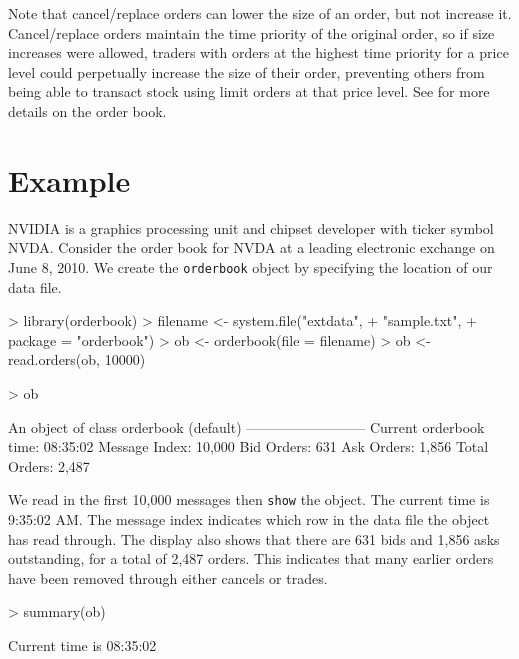 \documentclass[a4paper]{report}
\begin{document}
\begin{article}
Note that cancel/replace orders can lower the size of an order, but
not increase it. Cancel/replace orders maintain the time priority of
the original order, so if size increases were allowed, traders with
orders at the highest time priority for a price level could
perpetually increase the size of their order, preventing others from
being able to transact stock using limit orders at that price
level. See \cite{johnson:barry} for more details on the order book.

\section{Example}

NVIDIA is a graphics processing unit and chipset developer with ticker
symbol NVDA. Consider the order book for NVDA at a leading electronic
exchange on June 8, 2010. We create the \texttt{orderbook} object by
specifying the location of our data file.

\begin{Schunk}
\begin{Sinput}
> library(orderbook)
> filename <- system.file("extdata",
+                         "sample.txt",
+                         package = "orderbook")
> ob <- orderbook(file = filename)
> ob <- read.orders(ob, 10000)
\end{Sinput}
\end{Schunk}
\begin{Schunk}
\begin{Sinput}
> ob
\end{Sinput}
\begin{Soutput}
An object of class orderbook (default)
--------------------------
Current orderbook time:    08:35:02 
Message Index:             10,000 
Bid Orders:                631 
Ask Orders:                1,856 
Total Orders:              2,487 
\end{Soutput}
\end{Schunk}

We read in the first 10,000 messages then \texttt{show} the object.
The current time is 9:35:02 AM. The message index indicates which row
in the data file the object has read through. The display also shows
that there are 631 bids and 1,856 asks outstanding, for a total of
2,487 orders. This indicates that many earlier orders have been
removed through either cancels or trades.

\begin{Schunk}
\begin{Sinput}
> summary(ob)
\end{Sinput}
\begin{Soutput}
Current time is 08:35:02 


\end{Soutput}
\end{Schunk}
\end{article}
\end{document}
